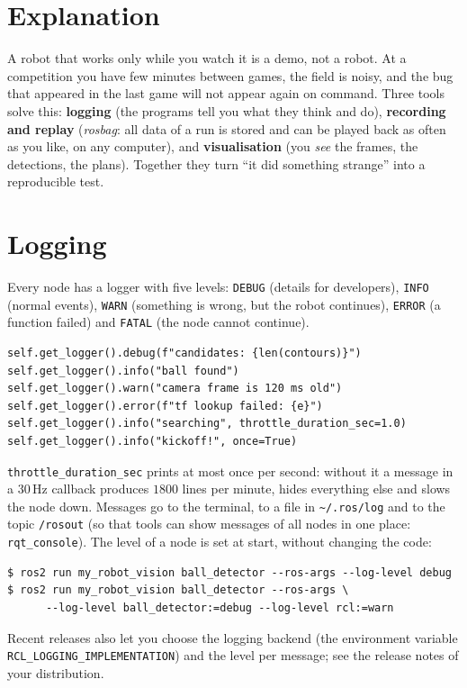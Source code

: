 \label{ch:ros5}

\section*{Explanation}
A robot that works only while you watch it is a demo, not a robot. At a competition you have few minutes between games, the field is noisy, and the bug that appeared in the last game will not appear again on command. Three tools solve this: \textbf{logging} (the programs tell you what they think and do), \textbf{recording and replay} (\emph{rosbag}: all data of a run is stored and can be played back as often as you like, on any computer), and \textbf{visualisation} (you \emph{see} the frames, the detections, the plans). Together they turn ``it did something strange'' into a reproducible test.

\section*{Logging}
Every node has a logger with five levels: \verb!DEBUG! (details for developers), \verb!INFO! (normal events), \verb!WARN! (something is wrong, but the robot continues), \verb!ERROR! (a function failed) and \verb!FATAL! (the node cannot continue).
\begin{verbatim}
self.get_logger().debug(f"candidates: {len(contours)}")
self.get_logger().info("ball found")
self.get_logger().warn("camera frame is 120 ms old")
self.get_logger().error(f"tf lookup failed: {e}")
self.get_logger().info("searching", throttle_duration_sec=1.0)
self.get_logger().info("kickoff!", once=True)
\end{verbatim}
\verb!throttle_duration_sec! prints at most once per second: without it a message in a $30$\,Hz callback produces $1800$ lines per minute, hides everything else and slows the node down. Messages go to the terminal, to a file in \verb!~/.ros/log! and to the topic \verb!/rosout! (so that tools can show messages of all nodes in one place: \verb!rqt_console!). The level of a node is set at start, without changing the code:
\begin{verbatim}
$ ros2 run my_robot_vision ball_detector --ros-args --log-level debug
$ ros2 run my_robot_vision ball_detector --ros-args \
      --log-level ball_detector:=debug --log-level rcl:=warn
\end{verbatim}
Recent releases also let you choose the logging backend (the environment variable \verb!RCL_LOGGING_IMPLEMENTATION!) and the level per message; see the release notes of your distribution.

